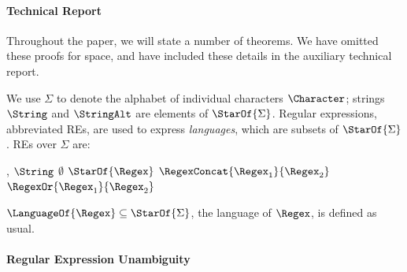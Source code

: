 \documentclass[sigplan,acmsmall]{acmart}
\begin{document}
\paragraph*{Technical Report} Throughout the paper, we will state a number of
theorems.  We have omitted these proofs for space, and have included these
details in the auxiliary technical report.


We use $\Sigma$ to denote the alphabet of individual characters $\Character$;
strings $\String$ and $\StringAlt$ are
elements of $\StarOf{\Sigma}$.  Regular expressions, abbreviated REs, are
used to express \emph{languages}, which are subsets of $\StarOf{\Sigma}$.
REs over $\Sigma$ are:
\begin{center}
  \Regex{},\RegexAlt{} \hspace{1em} \GEq{}
  \hspace{1em} $\String$ \hspace{1em} 
  \GBar{} \hspace{1em} $\emptyset$ \hspace{1em} 
  \GBar{} \hspace{1em} $\StarOf{\Regex}$ \hspace{1em} 
  \GBar{} \hspace{1em} $\RegexConcat{\Regex_1}{\Regex_2}$ \hspace{1em} 
  \GBar{} \hspace{1em} $\RegexOr{\Regex_1}{\Regex_2}$
\end{center}
$\LanguageOf{\Regex}\subseteq \StarOf{\Sigma}$, the language of $\Regex$, is
defined as usual. 

\paragraph*{\iffull Regular Expression \fi Unambiguity}

\end{document}
